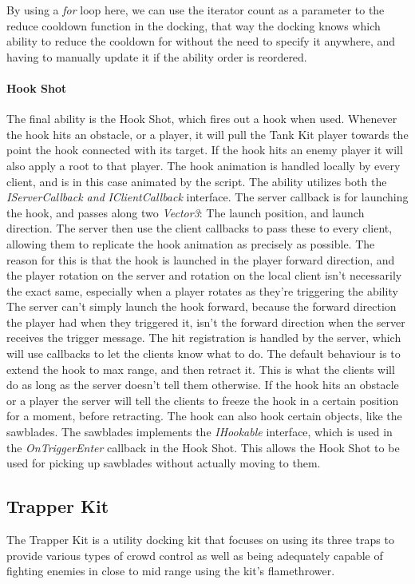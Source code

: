 By using a \emph{for} loop here, we can use the iterator count as a parameter to the reduce cooldown function in the docking, that way the docking knows which ability to reduce the cooldown for without the need to specify it anywhere, and having to manually update it if the ability order is reordered.

\paragraph{Hook Shot}
The final ability is the Hook Shot, which fires out a hook when used. Whenever the hook hits an obstacle, or a player, it will pull the Tank Kit player towards the point the hook connected with its target. If the hook hits an enemy player it will also apply a root to that player. The hook animation is handled locally by every client, and is in this case animated by the script. The ability utilizes both the \emph{IServerCallback and }\emph{IClientCallback} interface. The server callback is for launching the hook, and passes along two \emph{Vector3}: The launch position, and launch direction. The server then use the client callbacks to pass these to every client, allowing them to replicate the hook animation as precisely as possible. The reason for this is that the hook is launched in the player forward direction, and the player rotation on the server and rotation on the local client isn't necessarily the exact same, especially when a player rotates as they're triggering the ability The server can't simply launch the hook forward, because the forward direction the player had when they triggered it, isn't the forward direction when the server receives the trigger message. The hit registration is handled by the server, which will use callbacks to let the clients know what to do. The default behaviour is to extend the hook to max range, and then retract it. This is what the clients will do as long as the server doesn't tell them otherwise. If the hook hits an obstacle or a player the server will tell the clients to freeze the hook in a certain position for a moment, before retracting. The hook can also hook certain objects, like the sawblades. The sawblades implements the \emph{IHookable} interface, which is used in the \emph{OnTriggerEnter} callback in the Hook Shot. This allows the Hook Shot to be used for picking up sawblades without actually moving to them.

\subsection{Trapper Kit}
The Trapper Kit is a utility docking kit that focuses on using its three traps to provide various types of crowd control as well as being adequately capable of fighting enemies in close to mid range using the kit's flamethrower.  


